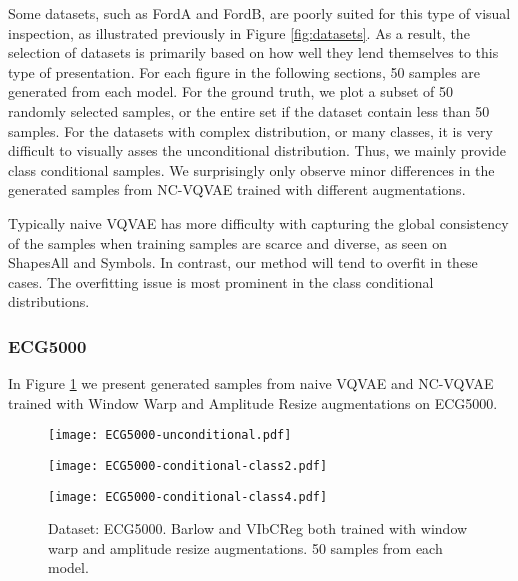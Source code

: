\documentclass[../../thesis.tex]{subfiles}
\begin{document}
Some datasets, such as FordA and FordB, are poorly suited for this type of visual inspection, as illustrated previously in Figure \ref{fig:datasets}. As a result, the selection of datasets is primarily based on how well they lend themselves to this type of presentation. For each figure in the following sections, 50 samples are generated from each model. For the ground truth, we plot a subset of 50 randomly selected samples, or the entire set if the dataset contain less than 50 samples. For the datasets with complex distribution, or many classes, it is very difficult to visually asses the unconditional distribution. Thus, we mainly provide class conditional samples. We surprisingly only observe minor differences in the generated samples from NC-VQVAE trained with different augmentations.\newline

Typically naive VQVAE has more difficulty with capturing the global consistency of the samples when training samples are scarce and diverse, as seen on ShapesAll and Symbols. In contrast, our method will tend to overfit in these cases. The overfitting issue is most prominent in the class conditional distributions.

\subsubsection{ECG5000}

In Figure \ref{fig:Warp_ECG5000} we present generated samples from naive VQVAE and NC-VQVAE trained with Window Warp and Amplitude Resize augmentations on ECG5000.\newline


\begin{figure}[h]
    \centering
    \begin{minipage}[b]{0.32\textwidth}
        \centering
        \texttt{[image: ECG5000-unconditional.pdf]}
    \end{minipage}
    \begin{minipage}[b]{0.32\textwidth}
        \centering
        \texttt{[image: ECG5000-conditional-class2.pdf]}
    \end{minipage}
    \begin{minipage}[b]{0.32\textwidth}
        \centering
        \texttt{[image: ECG5000-conditional-class4.pdf]}
    \end{minipage}
    \caption{Dataset: ECG5000. Barlow and VIbCReg both trained with window warp and amplitude resize augmentations. 50 samples from each model.}
    \label{fig:Warp_ECG5000}
\end{figure}
\end{document}
